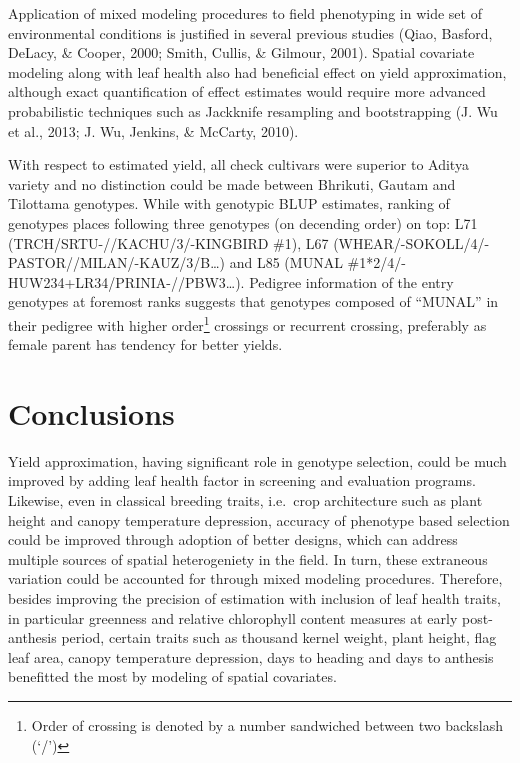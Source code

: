 \documentclass[12pt,oneside]{dukestatscithesis} %
\theoremstyle{definition}
\theoremstyle{definition}
\theoremstyle{definition}
\theoremstyle{remark}
\begin{document}
Application of mixed modeling procedures to field phenotyping in wide
set of environmental conditions is justified in several previous studies
(Qiao, Basford, DeLacy, \& Cooper, 2000; Smith, Cullis, \& Gilmour,
2001). Spatial covariate modeling along with leaf health also had
beneficial effect on yield approximation, although exact quantification
of effect estimates would require more advanced probabilistic techniques
such as Jackknife resampling and bootstrapping (J. Wu et al., 2013; J.
Wu, Jenkins, \& McCarty, 2010).

With respect to estimated yield, all check cultivars were superior to
Aditya variety and no distinction could be made between Bhrikuti, Gautam
and Tilottama genotypes. While with genotypic BLUP estimates, ranking of
genotypes places following three genotypes (on decending order) on top:
L71 (TRCH/SRTU-//KACHU/3/-KINGBIRD \#1), L67
(WHEAR/-SOKOLL/4/-PASTOR//MILAN/-KAUZ/3/B\ldots{}) and L85 (MUNAL
\#1*2/4/-HUW234+LR34/PRINIA-//PBW3\ldots{}). Pedigree information of the
entry genotypes at foremost ranks suggests that genotypes composed of
``MUNAL'' in their pedigree with higher order\footnote{Order of crossing
  is denoted by a number sandwiched between two backslash (`/')}
crossings or recurrent crossing, preferably as female parent has
tendency for better yields.

\chapter*{Conclusions}\label{conclusions}

Yield approximation, having significant role in genotype selection,
could be much improved by adding leaf health factor in screening and
evaluation programs. Likewise, even in classical breeding traits,
i.e.~crop architecture such as plant height and canopy temperature
depression, accuracy of phenotype based selection could be improved
through adoption of better designs, which can address multiple sources
of spatial heterogeniety in the field. In turn, these extraneous
variation could be accounted for through mixed modeling procedures.
Therefore, besides improving the precision of estimation with inclusion
of leaf health traits, in particular greenness and relative chlorophyll
content measures at early post-anthesis period, certain traits such as
thousand kernel weight, plant height, flag leaf area, canopy temperature
depression, days to heading and days to anthesis benefitted the most by
modeling of spatial covariates.
\end{document}
